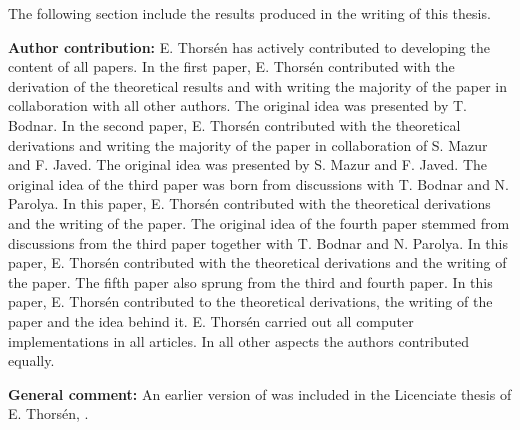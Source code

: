 \nocite{bodnar2019sampling_thesis, javed2021tangency_thesis, bodnar2021dynamic_thesis, bodnar2021empirical_thesis, bodnar2022double_thesis, bodnar2021quantile_thesis, bodnar2020quantile_thesis, bodnar2021bayesian_thesis, DOSPortfolio_thesis}
The following section include the results produced in the writing of this thesis.

\printbibliography[keyword={included_in_thesis}, title={Papers included in this thesis}, heading=subbibliography]

\textbf{Author contribution:} 
E. Thors\'en has actively contributed to developing the content of all papers.
In the first paper, E. Thors\'en contributed with the derivation of the theoretical results and with writing the majority of the paper in collaboration with all other authors. The original idea was presented by T. Bodnar.
In the second paper, E. Thors\'en contributed with the theoretical derivations and writing the majority of the paper in collaboration of S. Mazur and F. Javed. The original idea was presented by S. Mazur and F. Javed.
The original idea of the third paper was born from discussions with T. Bodnar and N. Parolya. 
In this paper, E. Thors\'en contributed with the theoretical derivations and the writing of the paper.
The original idea of the fourth paper stemmed from discussions from the third paper together with T. Bodnar and N. Parolya.
In this paper, E. Thors\'en contributed with the theoretical derivations and the writing of the paper.
The fifth paper also sprung from the third and fourth paper. 
In this paper, E. Thors\'en contributed to the theoretical derivations, the writing of the paper and the idea behind it.
E. Thorsén carried out all computer implementations in all articles.
In all other aspects the authors contributed equally.

\textbf{General comment:} An earlier version of \citet{bodnar2020sampling_thesis} was included in the Licenciate thesis of E. Thors\'en, \citet{thorsen2019assessment}.

\printbibliography[keyword={papers_list}, heading=subsubbibliography]
